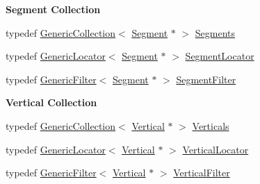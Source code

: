 \begin{Indent}\textbf{ Segment Collection}\par
\begin{DoxyCompactItemize}
\item 
typedef \mbox{\hyperlink{classHurricane_1_1GenericCollection}{Generic\+Collection}}$<$ \mbox{\hyperlink{classHurricane_1_1Segment}{Segment}} $\ast$ $>$ \mbox{\hyperlink{namespaceHurricane_a30748fa53a81cb597d4a13d651238716}{Segments}}
\item 
typedef \mbox{\hyperlink{classHurricane_1_1GenericLocator}{Generic\+Locator}}$<$ \mbox{\hyperlink{classHurricane_1_1Segment}{Segment}} $\ast$ $>$ \mbox{\hyperlink{namespaceHurricane_a37c8302c278e8c1c60c6ffc0222ec4c8}{Segment\+Locator}}
\item 
typedef \mbox{\hyperlink{classHurricane_1_1GenericFilter}{Generic\+Filter}}$<$ \mbox{\hyperlink{classHurricane_1_1Segment}{Segment}} $\ast$ $>$ \mbox{\hyperlink{namespaceHurricane_a891c4a2d614e158d183dada8b0ab1747}{Segment\+Filter}}
\end{DoxyCompactItemize}
\end{Indent}
\begin{Indent}\textbf{ Vertical Collection}\par
\begin{DoxyCompactItemize}
\item 
typedef \mbox{\hyperlink{classHurricane_1_1GenericCollection}{Generic\+Collection}}$<$ \mbox{\hyperlink{classHurricane_1_1Vertical}{Vertical}} $\ast$ $>$ \mbox{\hyperlink{namespaceHurricane_a146e2d3d34b4035aff422f12e85345b9}{Verticals}}
\item 
typedef \mbox{\hyperlink{classHurricane_1_1GenericLocator}{Generic\+Locator}}$<$ \mbox{\hyperlink{classHurricane_1_1Vertical}{Vertical}} $\ast$ $>$ \mbox{\hyperlink{namespaceHurricane_a0b7ececb547a716d7d509210a271aae4}{Vertical\+Locator}}
\item 
typedef \mbox{\hyperlink{classHurricane_1_1GenericFilter}{Generic\+Filter}}$<$ \mbox{\hyperlink{classHurricane_1_1Vertical}{Vertical}} $\ast$ $>$ \mbox{\hyperlink{namespaceHurricane_a3ac8462f707e425944df83c57835b13d}{Vertical\+Filter}}
\end{DoxyCompactItemize}
\end{Indent}
